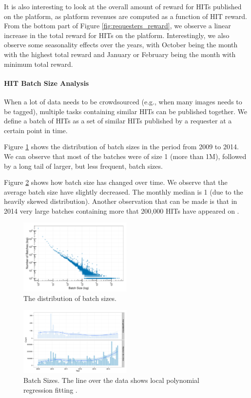 It is also interesting to look at the overall amount of reward for HITs published on the platform, as platform revenues are computed as a function of HIT reward. From the bottom part of Figure \ref{fig:requesters_reward}, we observe a linear increase in the total reward for HITs on the platform. Interestingly, we also observe some seasonality effects over the years, with October being the month with the highest total reward and January or February being the month with minimum total reward.


\paragraph{HIT Batch Size Analysis}
When a lot of data needs to be crowdsourced (e.g., when many images needs to be tagged), multiple  tasks containing similar HITs can be published together. We define a batch of HITs as a set of similar HITs published by a requester at a certain point in time. 

Figure \ref{fig:batch_size_pow} shows the distribution of batch sizes in the period from 2009 to 2014. We can observe that most of the batches were of size 1 (more than 1M), followed by a long tail of larger, but less frequent, batch sizes.

Figure \ref{fig:batch_size} shows how batch size has changed over time. We observe that the average batch size have slightly decreased. The monthly median is 1 (due to the heavily skewed distribution). Another observation that can be made is that in 2014 very large batches containing more that 200,000 HITs have appeared on \amt{}.

\begin{figure}[tb]
	\centering
		\includegraphics[width=0.5\textwidth]{figures/powerlaw}
	\caption{The distribution of batch sizes.}
	\label{fig:batch_size_pow}
\end{figure}

\begin{figure}[tb]
	\centering
		\includegraphics[width=0.5\textwidth]{figures/batch_size}
	\caption{Batch Sizes. The line over the data shows local polynomial regression fitting \cite{cleveland1992local}.}
	\label{fig:batch_size}
\end{figure}


